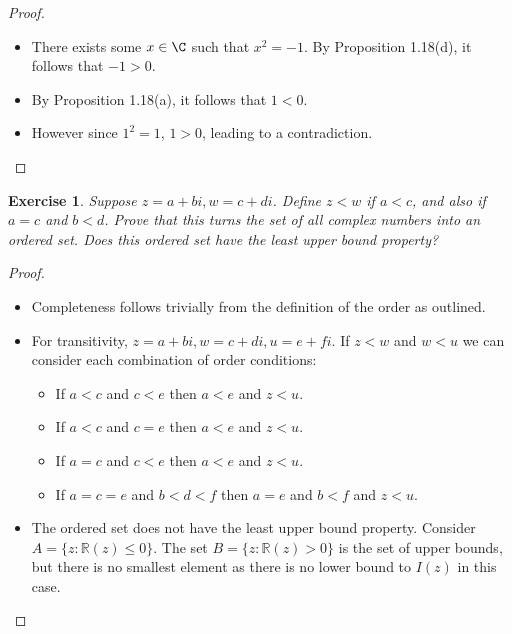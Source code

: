 \documentclass[12pt]{article}
\newtheorem{exercise}{Exercise}[section]
\newcommand{\R}{\mathbb{R}}
\begin{document}
\begin{proof}
    
    \begin{itemize}
        \item There exists some $x \in \C$ such that $x^2 = -1$. By Proposition 1.18(d), it follows that $-1 > 0$.
        \item By Proposition 1.18(a), it follows that $1 < 0$.
        \item However since $1^2 = 1$, $1 > 0$, leading to a contradiction.
    \end{itemize}
    
\end{proof}

\begin{exercise}
    Suppose $z = a+bi, w=c+di$. Define $z < w$ if $a<c$, and also if $a=c$ and $b< d$. Prove that this turns the set of all complex numbers into an ordered set. Does this ordered set have the least upper bound property?
\end{exercise}

\begin{proof}
    
    \begin{itemize}
        \item Completeness follows trivially from the definition of the order as outlined.
        \item For transitivity, $z = a+bi, w=c+di, u=e+fi$. If $z < w$ and $w < u$ we can consider each combination of order conditions:
        \begin{itemize}
            \item If $a < c$ and $c < e$ then $a < e$ and $z < u$.
            \item If $a < c$ and $c = e$ then $a < e$ and $z < u$.
            \item If $a = c$ and $c < e$ then $a < e$ and $z < u$.
            \item If $a = c = e$ and $b < d < f$ then $a = e$ and $b < f$ and $z < u$.
        \end{itemize}
        \item The ordered set does not have the least upper bound property. Consider $A = \{z: \R(z) \leq 0\}$. The set $B = \{z: \R(z) > 0\}$ is the set of upper bounds, but there is no smallest element as there is no lower bound to $I(z)$ in this case.
    \end{itemize}
    
\end{proof}
\end{document}
